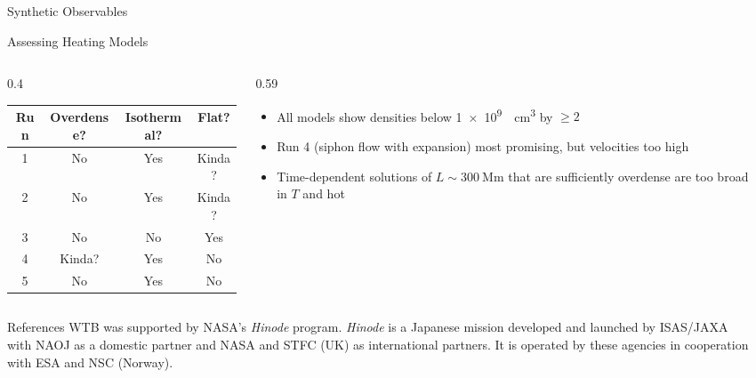 \documentclass[final]{beamer}
\newlength{\sepwidth}
\newlength{\colwidth}
\newcommand{\separatorcolumn}{\begin{column}{\sepwidth}\end{column}}
\begin{document}
\begin{frame}[t]
\begin{columns}[t]
\begin{column}{\colwidth}
\begin{block}{Synthetic Observables}
  \end{block}

  \begin{block}{Assessing Heating Models}

    \begin{columns}[c]
      \begin{column}{0.4\colwidth}
        \begin{table}
          \centering
          \begin{tabular}{c c c c}
            \toprule
            \textbf{Run} & \textbf{Overdense?} & \textbf{Isothermal?} & \textbf{Flat?} \\
            \midrule
            1 & No & Yes &  Kinda? \\
            2 & No & Yes & Kinda? \\
            3 & No & No &  Yes \\
            4 & Kinda? & Yes &  No \\
            5 & No & Yes & No \\
            \bottomrule
          \end{tabular}
        \end{table}    
      \end{column}
      \begin{column}{0.59\colwidth}
        \begin{itemize}
          \item All models show densities below \SI{1e9}{\per\cubic\cm} by $\ge2$
          \item Run 4 (siphon flow with expansion) most promising, but velocities too high
          \item Time-dependent solutions of $L\sim\SI{300}{\mega\m}$ that are sufficiently overdense are too broad in $T$ and hot
        \end{itemize}
      \end{column}
    \end{columns}

  \end{block}

  \begin{block}{References}
    \scriptsize
    WTB was supported by NASA's \textit{Hinode} program.
    \textit{Hinode} is a Japanese mission developed and launched by ISAS/JAXA with NAOJ as a domestic partner and NASA and STFC (UK) as international partners.
    It is operated by these agencies in cooperation with ESA and NSC (Norway).
    \begin{multicols}{2}
      
      
    \end{multicols}
  \end{block}

\end{column}

\separatorcolumn
\end{columns}
\end{frame}
\end{document}
